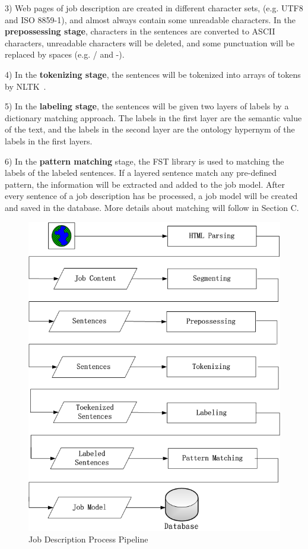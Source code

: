 3) Web pages of job description are created in different character sets, (e.g. UTF8 and ISO 8859-1), and almost always contain some unreadable characters. In the \textbf{prepossessing stage}, characters in the sentences are converted to ASCII characters, unreadable characters will be deleted, and some punctuation will be replaced by spaces (e.g. / and -).

4) In the \textbf{tokenizing stage}, the sentences will be tokenized into arrays of tokens by NLTK~\cite{bird2006nltk}.

5) In the \textbf{labeling stage}, the sentences will be given two layers of labels by a dictionary matching approach. The labels in the first layer are the semantic value of the text, and the labels in the second layer are the ontology hypernym of the labels in the first layers.

6) In the \textbf{pattern matching} stage, the FST library is used to matching the labels of the labeled sentences.  If a layered sentence match any pre-defined pattern, the information will be extracted and added to the job model. After every sentence of a job description has be processed, a job model will be created and saved in the database. More details about matching will follow in Section C.

\begin{figure}[htbp]
  \centering
  \includegraphics[scale=0.4]{images/pipeline2.png}
  \caption{Job Description Process Pipeline}
  \label{fig:Pipeline}
\end{figure}
